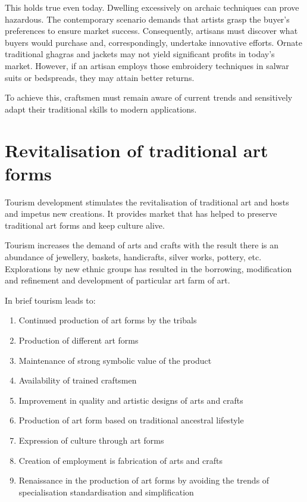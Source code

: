 This holds true even today. Dwelling excessively on archaic techniques can prove hazardous. The contemporary scenario demands that artists grasp the buyer's preferences to ensure market success. Consequently, artisans must discover what buyers would purchase and, correspondingly, undertake innovative efforts. Ornate traditional ghagras and jackets may not yield significant profits in today's market. However, if an artisan employs those embroidery techniques in salwar suits or bedspreads, they may attain better returns.

To achieve this, craftsmen must remain aware of current trends and sensitively adapt their traditional skills to modern applications.


\section{Revitalisation of traditional art forms} %
\label{sec:rev}

Tourism development stimulates the revitalisation of traditional art and hosts and impetus new creations. It provides market that has helped to preserve traditional art forms and keep culture alive.

Tourism increases the demand of arts and crafts with the result there is an abundance of jewellery, baskets, handicrafts, silver works, pottery, etc. Explorations by new ethnic groups has resulted in the borrowing, modification and refinement and development of particular art farm of art.

In brief tourism leads to:

\begin{enumerate}
  \item Continued production of art forms by the tribals
  \item Production of different art forms
  \item Maintenance of strong symbolic value of the product
  \item Availability of trained craftsmen
  \item Improvement in quality and artistic designs of arts and crafts
  \item Production of art form based on traditional ancestral lifestyle
  \item Expression of culture through art forms
  \item Creation of employment is fabrication of arts and crafts
  \item Renaissance in the production of art forms by avoiding the trends of specialisation standardisation and simplification
\end{enumerate}


